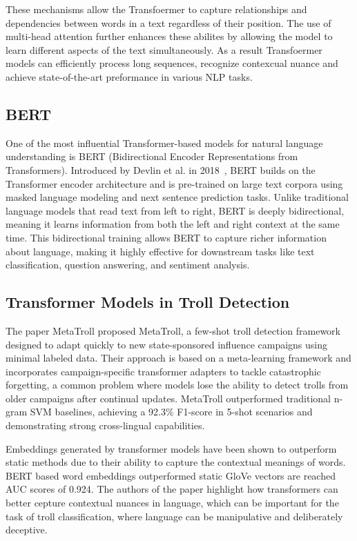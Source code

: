 \documentclass[twoside]{ctuthesis}
\theoremstyle{plain}
\theoremstyle{definition}
\theoremstyle{note}
\begin{document}
These mechanisms allow the Transfoermer to capture relationships and dependencies between words in a text regardless of their position. The use of multi-head attention further enhances these abilites by allowing the model to learn different aspects of the text simultaneously. As a result Transfoermer models can efficiently process long sequences, recognize contexcual nuance and achieve state-of-the-art preformance in various NLP tasks.\par

\subsection{BERT}

One of the most influential Transformer-based models for natural language understanding is BERT (Bidirectional Encoder Representations from Transformers). Introduced by Devlin et al. in 2018~\cite{Devlin2018}, BERT builds on the Transformer encoder architecture and is pre-trained on large text corpora using masked language modeling and next sentence prediction tasks. Unlike traditional language models that read text from left to right, BERT is deeply bidirectional, meaning it learns information from both the left and right context at the same time. This bidirectional training allows BERT to capture richer information about language, making it highly effective for downstream tasks like text classification, question answering, and sentiment analysis.

\subsection{Transformer Models in Troll Detection}
The paper MetaTroll proposed MetaTroll, a few-shot troll detection framework designed to adapt quickly to new state-sponsored influence campaigns using minimal labeled data. Their approach is based on a meta-learning framework and incorporates campaign-specific transformer adapters to tackle catastrophic forgetting, a common problem where models lose the ability to detect trolls from older campaigns after continual updates. MetaTroll outperformed traditional n-gram SVM baselines, achieving a 92.3\% F1-score in 5-shot scenarios and demonstrating strong cross-lingual capabilities.\cite{Tian2023}\par
Embeddings generated by transformer models have been shown to outperform static methods due to their ability to capture the contextual meanings of words. BERT based word embeddings outperformed static GloVe vectors are reached AUC scores of 0.924. The authors of the paper \cite{yilmaz2023} highlight how transformers can better cepture contextual nuances in language, which can be important for the task of troll classification, where language can be manipulative and deliberately deceptive.
\end{document}
